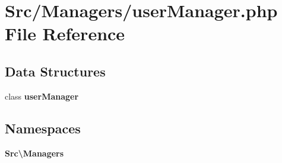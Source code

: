 \section{Src/\+Managers/user\+Manager.php File Reference}
\label{user_manager_8php}
\subsection*{Data Structures}
\begin{DoxyCompactItemize}
\item 
class \textbf{ user\+Manager}
\end{DoxyCompactItemize}
\subsection*{Namespaces}
\begin{DoxyCompactItemize}
\item 
 \textbf{ Src\textbackslash{}\+Managers}
\end{DoxyCompactItemize}
